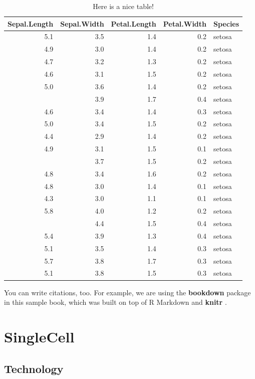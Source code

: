 \documentclass[
]{book}
\begin{document}
\begin{table}

\caption{\label{tab:nice-tab}Here is a nice table!}
\centering
\begin{tabular}[t]{rrrrl}
\toprule
Sepal.Length & Sepal.Width & Petal.Length & Petal.Width & Species\\
\midrule
5.1 & 3.5 & 1.4 & 0.2 & setosa\\
4.9 & 3.0 & 1.4 & 0.2 & setosa\\
4.7 & 3.2 & 1.3 & 0.2 & setosa\\
4.6 & 3.1 & 1.5 & 0.2 & setosa\\
5.0 & 3.6 & 1.4 & 0.2 & setosa\\
\addlinespace
5.4 & 3.9 & 1.7 & 0.4 & setosa\\
4.6 & 3.4 & 1.4 & 0.3 & setosa\\
5.0 & 3.4 & 1.5 & 0.2 & setosa\\
4.4 & 2.9 & 1.4 & 0.2 & setosa\\
4.9 & 3.1 & 1.5 & 0.1 & setosa\\
\addlinespace
5.4 & 3.7 & 1.5 & 0.2 & setosa\\
4.8 & 3.4 & 1.6 & 0.2 & setosa\\
4.8 & 3.0 & 1.4 & 0.1 & setosa\\
4.3 & 3.0 & 1.1 & 0.1 & setosa\\
5.8 & 4.0 & 1.2 & 0.2 & setosa\\
\addlinespace
5.7 & 4.4 & 1.5 & 0.4 & setosa\\
5.4 & 3.9 & 1.3 & 0.4 & setosa\\
5.1 & 3.5 & 1.4 & 0.3 & setosa\\
5.7 & 3.8 & 1.7 & 0.3 & setosa\\
5.1 & 3.8 & 1.5 & 0.3 & setosa\\
\bottomrule
\end{tabular}
\end{table}

You can write citations, too. For example, we are using the \textbf{bookdown} package \citep{R-bookdown} in this sample book, which was built on top of R Markdown and \textbf{knitr} \citep{xie2015}.

\hypertarget{sgcell}{%
\chapter{SingleCell}\label{sgcell}}

\hypertarget{technology}{%
\section{Technology}\label{technology}}
\end{document}
